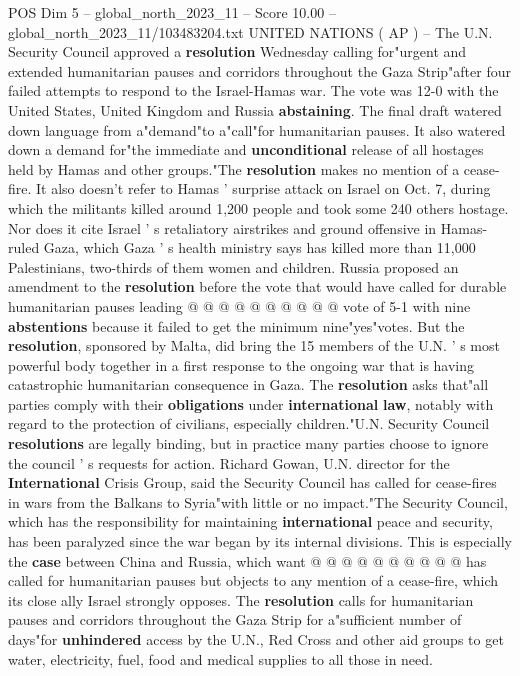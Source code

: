 \begin{textsample}{POS Dim 5 – global\_north\_2023\_11 – Score 10.00 – global\_north\_2023\_11/103483204.txt}  \label{ex:f5_pos_414}
UNITED NATIONS ( AP ) -- The U.N.
Security Council approved a \textbf{resolution} Wednesday calling for"urgent and extended humanitarian pauses and corridors throughout the Gaza Strip"after four failed attempts to respond to the Israel-Hamas war.
The vote was 12-0 with the United States, United Kingdom and Russia \textbf{abstaining}.
The final draft watered down language from a"demand"to a"call"for humanitarian pauses.
It also watered down a demand for"the immediate and \textbf{unconditional} release of all hostages held by Hamas and other groups."The \textbf{resolution} makes no mention of a cease-fire.
It also doesn't refer to Hamas ' surprise attack on Israel on Oct. 7, during which the militants killed around 1,200 people and took some 240 others hostage.
Nor does it cite Israel ' s retaliatory airstrikes and ground offensive in Hamas-ruled Gaza, which Gaza ' s health ministry says has killed more than 11,000 Palestinians, two-thirds of them women and children.
Russia proposed an amendment to the \textbf{resolution} before the vote that would have called for durable humanitarian pauses leading @ @ @ @ @ @ @ @ @ @ vote of 5-1 with nine \textbf{abstentions} because it failed to get the minimum nine"yes"votes.
But the \textbf{resolution}, sponsored by Malta, did bring the 15 members of the U.N. ' s most powerful body together in a first response to the ongoing war that is having catastrophic humanitarian consequence in Gaza.
The \textbf{resolution} asks that"all parties comply with their \textbf{obligations} under \textbf{international} \textbf{law}, notably with regard to the protection of civilians, especially children."U.N.
Security Council \textbf{resolutions} are legally binding, but in practice many parties choose to ignore the council ' s requests for action.
Richard Gowan, U.N. director for the \textbf{International} Crisis Group, said the Security Council has called for cease-fires in wars from the Balkans to Syria"with little or no impact."The Security Council, which has the responsibility for maintaining \textbf{international} peace and security, has been paralyzed since the war began by its internal divisions.
This is especially the \textbf{case} between China and Russia, which want @ @ @ @ @ @ @ @ @ @ has called for humanitarian pauses but objects to any mention of a cease-fire, which its close ally Israel strongly opposes.
The \textbf{resolution} calls for humanitarian pauses and corridors throughout the Gaza Strip for a"sufficient number of days"for \textbf{unhindered} access by the U.N., Red Cross and other aid groups to get water, electricity, fuel, food and medical supplies to all those in need.

\end{textsample}
